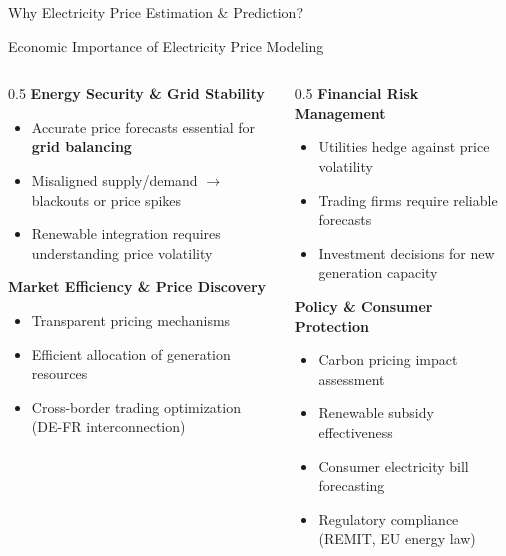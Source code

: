 \documentclass[aspectratio=169]{beamer}
\begin{document}
\begin{frame}{Why Electricity Price Estimation \& Prediction?}
\vspace{0.3cm}
\begin{center}
\end{center}
\end{frame}

\begin{frame}{Economic Importance of Electricity Price Modeling}
\begin{columns}
\begin{column}{0.5\textwidth}
\textbf{Energy Security \& Grid Stability}
\begin{itemize}
    \item Accurate price forecasts essential for \textbf{grid balancing}
    \item Misaligned supply/demand $\rightarrow$ blackouts or price spikes
    \item Renewable integration requires understanding price volatility
\end{itemize}

\vspace{0.3cm}
\textbf{Market Efficiency \& Price Discovery}
\begin{itemize}
    \item Transparent pricing mechanisms
    \item Efficient allocation of generation resources
    \item Cross-border trading optimization (DE-FR interconnection)
\end{itemize}
\end{column}

\begin{column}{0.5\textwidth}
\textbf{Financial Risk Management}
\begin{itemize}
    \item Utilities hedge against price volatility
    \item Trading firms require reliable forecasts
    \item Investment decisions for new generation capacity
\end{itemize}

\vspace{0.3cm}
\textbf{Policy \& Consumer Protection}
\begin{itemize}
    \item Carbon pricing impact assessment
    \item Renewable subsidy effectiveness
    \item Consumer electricity bill forecasting
    \item Regulatory compliance (REMIT, EU energy law)
\end{itemize}
\end{column}
\end{columns}
\end{frame}
\end{document}
